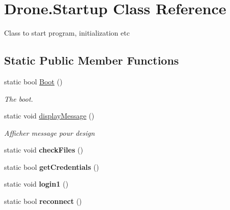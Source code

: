\hypertarget{class_drone_1_1_startup}{}\section{Drone.\+Startup Class Reference}
\label{class_drone_1_1_startup}


Class to start program, initialization etc  


\subsection*{Static Public Member Functions}
\begin{DoxyCompactItemize}
\item 
static bool \hyperlink{class_drone_1_1_startup_a627c372e8c1ad689cf2194fea4ec6ac0}{Boot} ()
\begin{DoxyCompactList}\small\item\em The boot. \end{DoxyCompactList}\item 
static void \hyperlink{class_drone_1_1_startup_a74e78aae21b32bfb04f7741e2bd3e271}{display\+Message} ()
\begin{DoxyCompactList}\small\item\em Afficher message pour design \end{DoxyCompactList}\item 
\hypertarget{class_drone_1_1_startup_af9b155440be10dfc2c3cda0af21b0aa5}{}static void {\bfseries check\+Files} ()\label{class_drone_1_1_startup_af9b155440be10dfc2c3cda0af21b0aa5}

\item 
\hypertarget{class_drone_1_1_startup_a29c1d6c7dbb950030ff9b2a77e03747d}{}static bool {\bfseries get\+Credentials} ()\label{class_drone_1_1_startup_a29c1d6c7dbb950030ff9b2a77e03747d}

\item 
\hypertarget{class_drone_1_1_startup_aaf13faca8b16a744994862174c871305}{}static void {\bfseries login1} ()\label{class_drone_1_1_startup_aaf13faca8b16a744994862174c871305}

\item 
\hypertarget{class_drone_1_1_startup_ac391e48bf2259063f8f9eeb0dda22e8a}{}static bool {\bfseries reconnect} ()\label{class_drone_1_1_startup_ac391e48bf2259063f8f9eeb0dda22e8a}

\end{DoxyCompactItemize}
